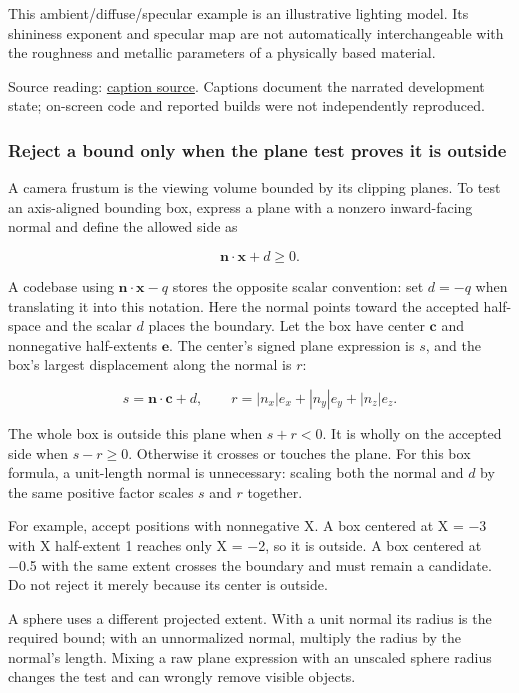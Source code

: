 This ambient/diffuse/specular example is an illustrative lighting model. Its shininess exponent and specular map are not automatically interchangeable with the roughness and metallic parameters of a physically based material.

Source reading: \href{https://www.youtube.com/watch?v=9O--xSmf5NU}{caption source}. Captions document the narrated development state; on-screen code and reported builds were not independently reproduced.

\subsubsection{Reject a bound only when the plane test proves it is outside}\label{06-engine-ii-ch026-reject-a-bound-only-when-the-plane-test-proves-it-is-outside}

\hypertarget{06-engine-ii-ch026-reject-a-bound-only-when-the-plane-test-proves-it-is-outside}{}

A camera frustum is the viewing volume bounded by its clipping planes. To test an axis-aligned bounding box, express a plane with a nonzero inward-facing normal and define the allowed side as

\[
\mathbf n\cdot\mathbf x+d\geq0.
\]

A codebase using \(\mathbf n\cdot\mathbf x-q\) stores the opposite scalar convention: set \(d=-q\) when translating it into this notation. Here the normal points toward the accepted half-space and the scalar \(d\) places the boundary. Let the box have center \(\mathbf c\) and nonnegative half-extents \(\mathbf e\). The center's signed plane expression is \(s\), and the box's largest displacement along the normal is \(r\):

\[
s=\mathbf n\cdot\mathbf c+d,
\qquad
r=|n_x|e_x+|n_y|e_y+|n_z|e_z.
\]

The whole box is outside this plane when \(s+r<0\). It is wholly on the accepted side when \(s-r\geq0\). Otherwise it crosses or touches the plane. For this box formula, a unit-length normal is unnecessary: scaling both the normal and \(d\) by the same positive factor scales \(s\) and \(r\) together.

For example, accept positions with nonnegative X. A box centered at X = −3 with X half-extent 1 reaches only X = −2, so it is outside. A box centered at −0.5 with the same extent crosses the boundary and must remain a candidate. Do not reject it merely because its center is outside.

A sphere uses a different projected extent. With a unit normal its radius is the required bound; with an unnormalized normal, multiply the radius by the normal's length. Mixing a raw plane expression with an unscaled sphere radius changes the test and can wrongly remove visible objects.

